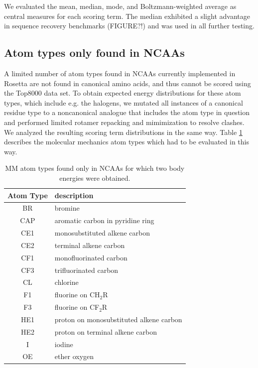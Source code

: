 We evaluated the mean, median, mode, and Boltzmann-weighted average as central measures for each scoring term.
The median exhibited a slight advantage in sequence recovery benchmarks (FIGURE?!) and was used in all further testing.

\subsection{Atom types only found in NCAAs}
A limited number of atom types found in NCAAs currently implemented in Rosetta are not found in canonical amino acids, and thus cannot be scored using the Top8000 data set.
To obtain expected energy distributions for these atom types, which include e.g. the halogens, we mutated all instances of a canonical residue type to a noncanonical analogue that includes the atom type in question and performed limited rotamer repacking and mimimization to resolve clashes.
We analyzed the resulting scoring term distributions in the same way.
Table \ref{tab:atypes_all} describes the molecular mechanics atom types which had to be evaluated in this way.


\begin{table}
  \centering
  \caption{MM atom types found only in NCAAs for which two body energies were obtained.}
  \label{tab:atypes_all}

  \begin{tabular}{c|l}
    \toprule
    Atom Type & description\\
    \midrule
    BR & bromine\\
    CAP & aromatic carbon in pyridine ring\\
    CE1 & monosubstituted alkene carbon\\
    CE2 & terminal alkene carbon\\
    CF1 & monofluorinated carbon\\
    CF3 & trifluorinated carbon\\
    CL & chlorine\\
    F1 & fluorine on CH$_2$R\\
    F3 & fluorine on CF$_2$R\\
    HE1 & proton on monosubstituted alkene carbon \\
    HE2 & proton on terminal alkene carbon\\
    I & iodine\\
    OE & ether oxygen\\
    \bottomrule
  \end{tabular}
\end{table}


